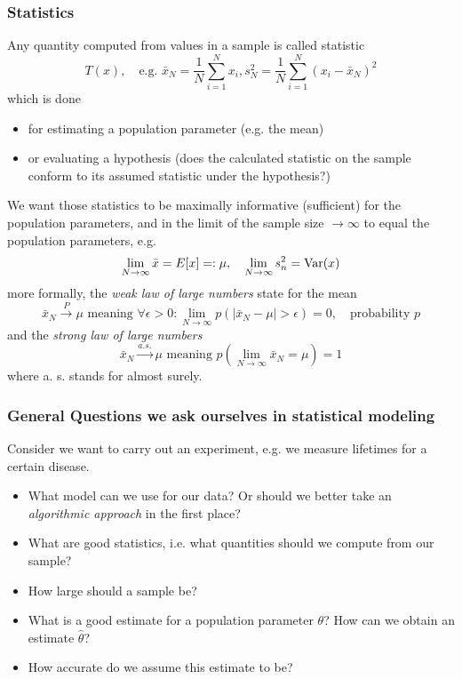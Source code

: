 \subsubsection{Statistics}
Any quantity computed from values in a sample is called statistic
\begin{equation}
    T(x), \quad \text{e.g. } \bar{x}_N = \frac{1}{N} \sum_{i=1}^N x_i, s_N^2 = \frac{1}{N} \sum_{i=1}^N (x_i - \bar{x}_N)^2
\end{equation}
which is done
\begin{itemize}
    \item for estimating a population parameter (e.g. the mean)
    \item or evaluating a hypothesis (does the calculated statistic on the sample conform to its assumed statistic under the hypothesis?)
\end{itemize}
We want those statistics to be maximally informative (sufficient) for the population parameters,
and in the limit of the sample size $\rightarrow \infty$ to equal the population parameters, e.g.
\begin{equation}
    \lim_{N\rightarrow \infty} \bar{x} = E[x] =: \mu, \quad \lim_{N\rightarrow \infty} s_n^2 = \operatorname{Var}(x)
\end{equation}
more formally, the \textit{weak law of large numbers} state for the mean
\begin{equation}
    \bar{x}_N \overset{P}{\rightarrow} \mu \text{ meaning } \forall \epsilon > 0: \lim_{N \rightarrow \infty} p(|\bar{x}_N - \mu | > \epsilon) = 0, \quad \text{probability } p
\end{equation}
and the \textit{strong law of large numbers}
\begin{equation}
    \bar{x}_N \overset{a.s.}{\rightarrow} \mu \text{ meaning } p(\lim_{N\rightarrow \infty} \bar{x}_N = \mu) = 1
\end{equation}
where a. s. stands for almost surely.

\subsubsection{General Questions we ask ourselves in statistical modeling}
Consider we want to carry out an experiment, e.g. we measure lifetimes for a certain disease.
\begin{itemize}
    \item What model can we use for our data? Or should we better take an \textit{algorithmic approach} in the first place?
    \item What are good statistics, i.e. what quantities should we compute from our sample?
    \item How large should a sample be?
    \item What is a good estimate for a population parameter $\theta$? How can we obtain an estimate $\hat{\theta}$?
    \item How accurate do we assume this estimate to be?
\end{itemize}

